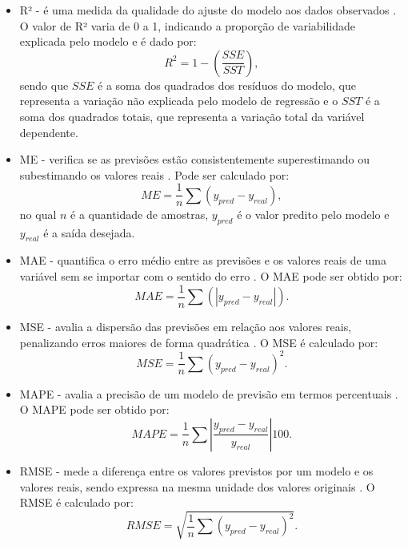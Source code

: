 \begin{itemize}
    \item \ac{R²} - é uma medida da qualidade do ajuste do modelo aos dados observados \cite{Charlene, Jian_Forecasting}. O valor de R² varia de 0 a 1, indicando a proporção de variabilidade explicada pelo modelo e é dado por:
    \begin{equation}
        \label{R²}
        R^2 = 1- \left(\frac{SSE}{SST}\right),
    \end{equation}
    sendo que $SSE$ é a soma dos quadrados dos resíduos do modelo, que representa a variação não explicada pelo modelo de regressão e o $SST$ é a soma dos quadrados totais, que representa a variação total da variável dependente.
    
    \item \ac{ME} - verifica se as previsões estão consistentemente superestimando ou subestimando os valores reais \cite{Leonardo_Comparative}. Pode ser calculado por:
    \begin{equation}
        \label{eq:ME}
        ME = \frac{1}{n} \sum(y_{pred} - y_{real}),
    \end{equation}
    no qual $n$ é a quantidade de amostras, $y_{pred}$ é o valor predito pelo modelo e $y_{real}$ é a saída desejada.
    
    \item \ac{MAE} - quantifica o erro médio entre as previsões e os valores reais de uma variável sem se importar com o sentido do erro \cite{Amin_Aminimehr_Comprehensive, Manrui_two-stage}. O \ac{MAE} pode ser obtido por:
    \begin{equation}
        \label{eq:MAE}
        MAE = \frac{1}{n} \sum(|y_{pred} - y_{real}|).
    \end{equation}
    
    \item \ac{MSE} - avalia a dispersão das previsões em relação aos valores reais, penalizando erros maiores de forma quadrática \cite{Jian_Forecasting, Chaojie_Stock}. O \ac{MSE} é calculado por:
    \begin{equation}
        \label{eq:MSE}
        MSE = \frac{1}{n} \sum(y_{pred} - y_{real})^2.
    \end{equation}
    
    \item \ac{MAPE} - avalia a precisão de um modelo de previsão em termos percentuais \cite{Anand_Comparison, Firat}. O \ac{MAPE} pode ser obtido por:
    \begin{equation}
        \label{eq:MAPE}
        MAPE = \frac{1}{n} \sum \left | \frac{y_{pred} - y_{real}}{y_{real}} \right | 100.
    \end{equation}
    
    \item \ac{RMSE} - mede a diferença entre os valores previstos por um modelo e os valores reais, sendo expressa na mesma unidade dos valores originais \cite{altan2019effect, pabucccu2023forecasting}. O \ac{RMSE} é calculado por:
    \begin{equation}
        \label{eq:RMSE}
        RMSE = \sqrt{\frac{1}{n} \sum(y_{pred} - y_{real})^2}.
    \end{equation}
\end{itemize}



